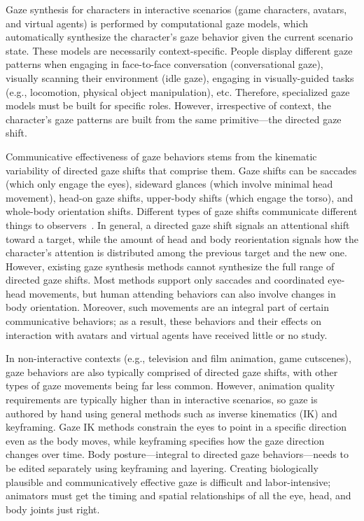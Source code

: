 Gaze synthesis for characters in interactive scenarios (game characters, avatars, and virtual agents) is performed by computational gaze models, which automatically synthesize the character's gaze behavior given the current scenario state.
These models are necessarily context-specific. People display different gaze patterns when engaging in face-to-face conversation (conversational gaze), visually scanning their environment (idle gaze), engaging in visually-guided tasks (e.g., locomotion, physical object manipulation), etc. Therefore, specialized gaze models must be built for specific roles.
However, irrespective of context, the character's gaze patterns are built from the same primitive---the directed gaze shift.

Communicative effectiveness of gaze behaviors stems from the kinematic variability of directed gaze shifts that comprise them. Gaze shifts can be saccades (which only engage the eyes), sideward glances (which involve minimal head movement), head-on gaze shifts, upper-body shifts (which engage the torso), and whole-body orientation shifts. Different types of gaze shifts communicate different things to observers~\citep{langton2000eyes}. In general, a directed gaze shift signals an attentional shift toward a target, while the amount of head and body reorientation signals how the character's attention is distributed among the previous target and the new one.
However, existing gaze synthesis methods cannot synthesize the full range of directed gaze shifts. Most methods support only saccades and coordinated eye-head movements, but human attending behaviors can also involve changes in body orientation. Moreover, such movements are an integral part of certain communicative behaviors; as a result, these behaviors and their effects on interaction with avatars and virtual agents have received little or no study.

In non-interactive contexts (e.g., television and film animation, game cutscenes), gaze behaviors are also typically comprised of directed gaze shifts, with other types of gaze movements being far less common. However, animation quality requirements are typically higher than in interactive scenarios, so gaze is authored by hand using general methods such as inverse kinematics (IK) and keyframing. Gaze IK methods constrain the eyes to point in a specific direction even as the body moves, while keyframing specifies how the gaze direction changes over time. Body posture---integral to directed gaze behaviors---needs to be edited separately using keyframing and layering. Creating biologically plausible and communicatively effective gaze is difficult and labor-intensive; animators must get the timing and spatial relationships of all the eye, head, and body joints just right.

